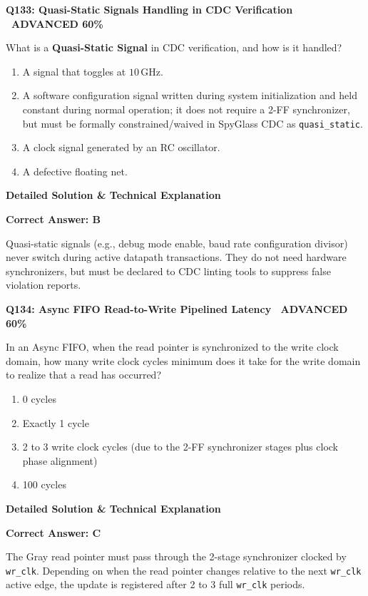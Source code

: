 \documentclass[11pt,a4paper]{article}
\newcommand{\badgeadv}{{\color{white}\colorbox{advred}{\bfseries\sffamily\tiny\ ADVANCED 60\%\ }}}
\newenvironment{qbox}[2]{%
  \begin{mdframed}[style=qstyle]%
  {\bfseries\sffamily\color{primaryblue}#1 \hfill #2}\par\vspace{2pt}%
}{%
  \end{mdframed}%
}
\newenvironment{ansbox}{%
  \begin{mdframed}[style=ansstyle]%
  {\bfseries\sffamily\color{ansgreen}\small Detailed Solution \& Technical Explanation}\par\vspace{2pt}\small%
}{%
  \end{mdframed}%
}
\begin{document}
\begin{qbox}{Q133: Quasi-Static Signals Handling in CDC Verification}{\badgeadv}
What is a \textbf{Quasi-Static Signal} in CDC verification, and how is it handled?
\begin{enumerate}[label=\textbf{\Alph*.}]
  \item A signal that toggles at $10\,\text{GHz}$.
  \item A software configuration signal written during system initialization and held constant during normal operation; it does not require a 2-FF synchronizer, but must be formally constrained/waived in SpyGlass CDC as \texttt{quasi\_static}.
  \item A clock signal generated by an RC oscillator.
  \item A defective floating net.
\end{enumerate}
\end{qbox}
\begin{ansbox}
\textbf{Correct Answer: B}

Quasi-static signals (e.g., debug mode enable, baud rate configuration divisor) never switch during active datapath transactions. They do not need hardware synchronizers, but must be declared to CDC linting tools to suppress false violation reports.
\end{ansbox}

\begin{qbox}{Q134: Async FIFO Read-to-Write Pipelined Latency}{\badgeadv}
In an Async FIFO, when the read pointer is synchronized to the write clock domain, how many write clock cycles minimum does it take for the write domain to realize that a read has occurred?
\begin{enumerate}[label=\textbf{\Alph*.}]
  \item 0 cycles
  \item Exactly 1 cycle
  \item 2 to 3 write clock cycles (due to the 2-FF synchronizer stages plus clock phase alignment)
  \item 100 cycles
\end{enumerate}
\end{qbox}
\begin{ansbox}
\textbf{Correct Answer: C}

The Gray read pointer must pass through the 2-stage synchronizer clocked by \texttt{wr\_clk}. Depending on when the read pointer changes relative to the next \texttt{wr\_clk} active edge, the update is registered after 2 to 3 full \texttt{wr\_clk} periods.
\end{ansbox}
\end{document}
